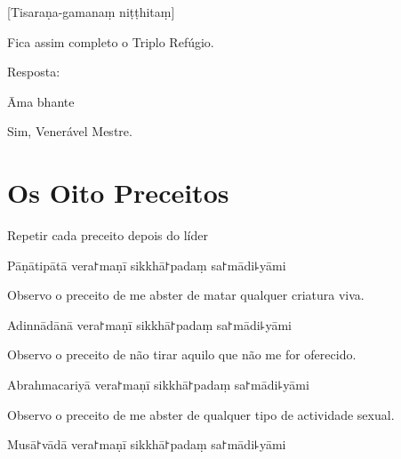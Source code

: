 [Tisaraṇa-gamanaṃ niṭṭhitaṃ]

\begin{english}
  Fica assim completo o Triplo Refúgio.
\end{english}

\begin{instruction}
  Resposta:
\end{instruction}

Āma bhante

\begin{english}
  Sim, Venerável Mestre.
\end{english}

\chapter{Os Oito Preceitos}

\begin{instruction}
  Repetir cada preceito depois do líder
\end{instruction}

\begin{precept}
  \setcounter{enumi}{0}
  \item Pāṇātipātā vera꜓maṇī sikkhā꜓padaṃ sa꜓mādi꜕yāmi
\end{precept}

\begin{english}
  Observo o preceito de me abster de matar qualquer criatura viva.
\end{english}

\begin{precept}
  \setcounter{enumi}{1}
  \item Adinnādānā vera꜓maṇī sikkhā꜓padaṃ sa꜓mādi꜕yāmi
\end{precept}

\begin{english}
  Observo o preceito de não tirar aquilo que não me for oferecido.
\end{english}

\begin{precept}
  \setcounter{enumi}{2}
  \item Abrahmacariyā vera꜓maṇī sikkhā꜓padaṃ sa꜓mādi꜕yāmi
\end{precept}

\begin{english}
  Observo o preceito de me abster de qualquer tipo de actividade sexual.
\end{english}

\begin{precept}
  \setcounter{enumi}{3}
  \item Musā꜓vādā vera꜓maṇī sikkhā꜓padaṃ sa꜓mādi꜕yāmi
\end{precept}

